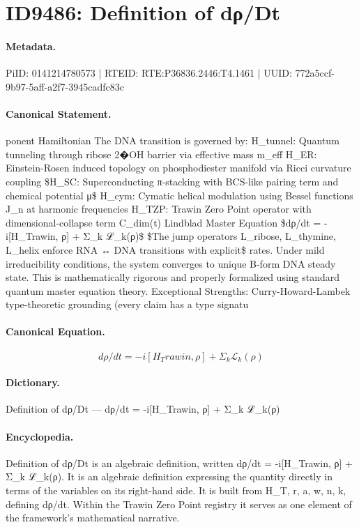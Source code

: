 \section*{ID9486: Definition of dρ/Dt}
\paragraph{Metadata.}
PiID: 0141214780573 | RTEID: RTE:P36836.2446:T4.1461 | UUID: 772a5ccf-9b97-5aff-a2f7-3945cadfc83c

\paragraph{Canonical Statement.}
ponent Hamiltonian The DNA transition is governed by: H\_tunnel: Quantum tunneling through ribose 2�OH barrier via effective mass m\_eff H\_ER: Einstein-Rosen induced topology on phosphodiester manifold via Ricci curvature coupling \$H\_SC: Superconducting π-stacking with BCS-like pairing term and chemical potential μ\$ H\_cym: Cymatic helical modulation using Bessel functions J\_n at harmonic frequencies H\_TZP: Trawin Zero Point operator with dimensional-collapse term C\_dim(t) Lindblad Master Equation \$dρ/dt = -i[H\_Trawin, ρ] + Σ\_k ℒ\_k(ρ)\$ \$The jump operators L\_ribose, L\_thymine, L\_helix enforce RNA ↔ DNA transitions with explicit\$ rates. Under mild irreducibility conditions, the system converges to unique B-form DNA steady state. This is mathematically rigorous and properly formalized using standard quantum master equation theory. Exceptional Strengths: Curry-Howard-Lambek type-theoretic grounding (every claim has a type signatu

\paragraph{Canonical Equation.}
\[
dρ/dt = -i[H_Trawin, ρ] + Σ_k ℒ_k(ρ)
\]

\paragraph{Dictionary.}
Definition of dρ/Dt — dρ/dt = -i[H\_Trawin, ρ] + Σ\_k ℒ\_k(ρ)

\paragraph{Encyclopedia.}
Definition of dρ/Dt is an algebraic definition, written dρ/dt = -i[H\_Trawin, ρ] + Σ\_k ℒ\_k(ρ). It is an algebraic definition expressing the quantity directly in terms of the variables on its right-hand side. It is built from H\_T, r, a, w, n, k, defining dρ/dt. Within the Trawin Zero Point registry it serves as one element of the framework's mathematical narrative.
